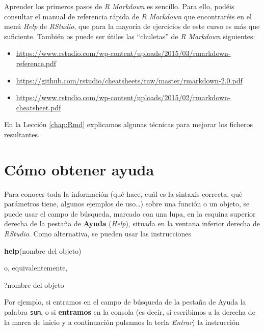\documentclass[
]{book}
\newenvironment{Shaded}{\begin{snugshade}}{\end{snugshade}}
\newcommand{\KeywordTok}[1]{\textcolor[rgb]{0.13,0.29,0.53}{\textbf{#1}}}
\newcommand{\NormalTok}[1]{#1}
\theoremstyle{definition}
\theoremstyle{definition}
\theoremstyle{definition}
\theoremstyle{remark}
\begin{document}
Aprender los primeros pasos de \emph{R Markdown} es sencillo. Para ello, podéis consultar el manual de referencia rápida de \emph{R Markdown} que encontraréis en el menú \emph{Help} de \emph{RStudio}, que para la mayoría de ejercicios de este curso es más que suficiente.
También os puede ser útiles las ``chuletas'' de \emph{R Markdown} siguientes:

\begin{itemize}
\item
  \url{https://www.rstudio.com/wp-content/uploads/2015/03/rmarkdown-reference.pdf}
\item
  \url{https://github.com/rstudio/cheatsheets/raw/master/rmarkdown-2.0.pdf}
\item
  \url{https://www.rstudio.com/wp-content/uploads/2015/02/rmarkdown-cheatsheet.pdf}
\end{itemize}

En la Lección \ref{chap:Rmd} explicamos algunas técnicas para mejorar los ficheros resultantes.

\hypertarget{sec:help}{%
\section{Cómo obtener ayuda}\label{sec:help}}

Para conocer toda la información (qué hace, cuál es la sintaxis correcta, qué parámetros tiene, algunos ejemplos de uso\ldots) sobre una función o un objeto, se puede usar el campo de búsqueda, marcado con una lupa, en la esquina superior derecha de la pestaña de \textbf{Ayuda} (\emph{Help}), situada en la ventana inferior derecha de \emph{RStudio}. Como alternativa, se pueden usar las instrucciones

\begin{Shaded}
\begin{Highlighting}[]
\KeywordTok{help}\NormalTok{(nombre del objeto)}
\end{Highlighting}
\end{Shaded}

o, equivalentemente,

\begin{Shaded}
\begin{Highlighting}[]
\NormalTok{?nombre del objeto}
\end{Highlighting}
\end{Shaded}

Por ejemplo, si entramos en el campo de búsqueda de la pestaña de Ayuda la palabra \texttt{sum}, o si \textbf{entramos} en la consola (es decir, si escribimos a la derecha de la marca de inicio y a continuación pulsamos la tecla \emph{Entrar}) la instrucción
\end{document}
